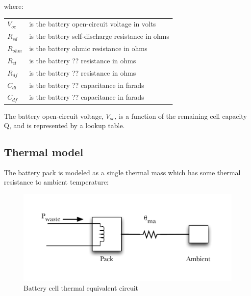 \documentclass{article}
\begin{document}
		where:
		\begin{center}
		\begin{tabular}{l l}
			$V_{oc}$		&	is the battery open-circuit voltage in volts	\\
			$R_{sd}$		&	is the battery self-discharge resistance in ohms \\
			$R_{ohm}	$	&	is the battery ohmic resistance in ohms \\
			$R_{ct}$		& 	is the battery ?? resistance in ohms \\
			$R_{df}$		&	is the battery ?? resistance in ohms \\
			$C_{dl}$		&	is the battery ?? capacitance in farads \\
			$C_{df}$		& 	is the battery ?? capacitance in farads
		\end{tabular}
		\end{center}
		
		The battery open-circuit voltage, $V_{oc}$, is a function of the remaining cell capacity Q, and is represented by a lookup table.
		
		
		
	\subsection{Thermal model}
		The battery pack is modeled as a single thermal mass which has some thermal resistance to ambient temperature:
		
		\begin{figure}[h!]
				\centering
				\includegraphics[width=\linewidth]{Figures/Battery_pack_thermal_equivalent_circuit}
				\caption{Battery cell thermal equivalent circuit}
				\label{fig:Battery_pack_thermal_equivalent_circuit}
		\end{figure}
		\FloatBarrier
		
\end{document}

